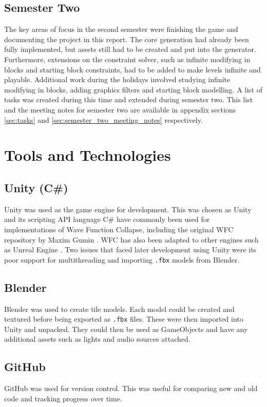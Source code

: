 \subsection{Semester Two}
The key areas of focus in the second semester were finishing the game and documenting the project in this report. The core generation had already been fully implemented, but assets still had to be created and put into the generator. Furthermore, extensions on the constraint solver, such as infinite modifying in blocks and starting block constraints, had to be added to make levels infinite and playable. Additional work during the holidays involved studying infinite modifying in blocks, adding graphics filters and starting block modelling. A list of tasks was created during this time and extended during semester two. This list and the meeting notes for semester two are available in appendix sections \ref{sec:tasks} and \ref{sec:semester_two_meeting_notes} respectively.

\section{Tools and Technologies}
\subsection{Unity (C\#)}
Unity was used as the game engine for development. This was chosen as Unity and its scripting API language C\# have commonly been used for implementations of Wave Function Collapse, including the original WFC repository by Maxim Gumin \cite{Gumin_Wave_Function_Collapse_2016}. WFC has also been adapted to other engines such as Unreal Engine \cite{unreal_engine_WFC}. Two issues that faced later development using Unity were its poor support for multithreading and importing \texttt{.fbx} models from Blender.

\subsection{Blender}
Blender was used to create tile models. Each model could be created and textured before being exported as \texttt{.fbx} files. These were then imported into Unity and unpacked. They could then be used as GameObjects and have any additional assets such as lights and audio sources attached.

\subsection{GitHub}
GitHub was used for version control. This was useful for comparing new and old code and tracking progress over time.

